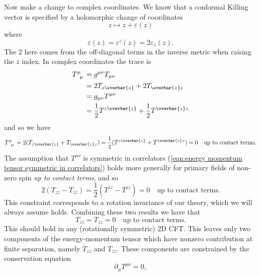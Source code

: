 \documentclass[fleqn]{NotesClass}
\begin{document}
    Now make a change to complex coordinates.
    We know that a conformal Killing vector is specified by a holomorphic change of coordinates
    \begin{equation}
        z \mapsto z + \varepsilon(z)
    \end{equation}
    where
    \begin{equation}
        \varepsilon(z) = \varepsilon^z(z) = 2\varepsilon_{\overbar{z}}(z).
    \end{equation}
    The 2 here comes from the off-diagonal terms in the inverse metric when raising the \(\overbar{z}\) index.
    In complex coordinates the trace is
    \begin{align}
        \tensor{T}{^\mu_\mu} &= g^{\mu\nu}T_{\mu\nu}\\
        &= 2T_{z\overbar{z}} + 2T_{\overbar{z}z}\\
        &= g_{\mu\nu}T^{\mu\nu}\\
        &= \frac{1}{2}T^{z\overbar{z}} + \frac{1}{2}T^{\overbar{z}z}
    \end{align}
    and so we have
    \begin{equation}
        \tensor{T}{^\mu_\mu} = 2(T_{z\overbar{z}} + T_{\overbar{z}z}) = \frac{1}{2}(T^{z\overbar{z}} + T^{\overbar{z}z}) = 0 \quad \text{up to contact terms}.
    \end{equation}
    The assumption that \(T^{\mu\nu}\) is symmetric in correlators (\cref{eqn:energy momentum tensor symmetric in correlators}) holds more generally for primary fields of non-zero spin \emph{up to contact terms}, and so
    \begin{equation}
        2(T_{z\overbar{z}} - T_{\overbar{z}z}) = \frac{1}{2}(T^{\overbar{z}z} - T^{z\overbar{z}}) = 0 \quad \text{up to contact terms}.
    \end{equation}
    This constraint corresponds to a rotation invariance of our theory, which we will always assume holds.
    Combining these two results we have that
    \begin{equation}
        T_{z\overbar{z}} = T_{\overbar{z}z} = 0 \quad \text{up to contact terms}.
    \end{equation}
    This should hold in any (rotationally symmetric) 2D CFT.
    This leaves only two components of the energy-momentum tensor which have nonzero contribution at finite separation, namely \(T_{zz}\) and \(T_{\overbar{z}\overbar{z}}\).
    These components are constrained by the conservation equation
    \begin{equation}
        \partial_\mu T^{\mu\nu} = 0,
    \end{equation}
\end{document}
